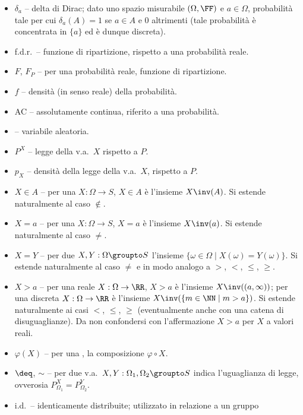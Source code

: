 \begin{multicols*}{2}
\begin{itemize}
        \item $\delta_a$ -- delta di Dirac; dato uno spazio misurabile $(\Omega, \FF)$ e $a \in \Omega$, probabilità tale per cui
        $\delta_a(A) = 1$ se $a \in A$ e $0$ altrimenti (tale probabilità è concentrata in $\{a\}$ ed è dunque
        discreta).
        \item f.d.r.~-- funzione di ripartizione, rispetto a una probabilità reale.
        \item $F$, $F_P$ -- per una probabilità reale, funzione di ripartizione.
        \item $f$ -- densità (in senso reale) della probabilità.
        \item AC -- assolutamente continua, riferito a una probabilità.
        \item \va -- variabile aleatoria.
        \item $P^X$ -- legge della v.a.~$X$ rispetto a $P$.
        \item $p_X$ -- densità della legge della v.a.~$X$, rispetto a $P$.
        \item $X \in A$ -- per una \va $X : \Omega \to S$,
        $X \in A$ è l'insieme $X\inv(A)$. Si estende naturalmente
        al caso $\notin$.
        \item $X = a$ -- per una \va $X : \Omega \to S$,
        $X = a$ è l'insieme $X\inv(a)$. Si estende naturalmente
        al caso $\neq$.
        \item $X = Y$ -- per due \va $X, Y : \Omega \groupto S$
        l'insieme $\{ \omega \in \Omega \mid X(\omega) = Y(\omega) \}$.
        Si estende naturalmente al caso $\neq$ e in modo analogo a $>$, $<$, $\leq$, $\geq$.
        \item $X > a$ -- per una \va reale $X : \Omega \to \RR$,
        $X > a$ è l'insieme $X\inv((a, \infty))$; per una \va discreta
        $X : \Omega \to \RR$ è l'insieme $X\inv(\{m \in \NN \mid m > a\})$.
        Si estende naturalmente ai casi $<$, $\leq$, $\geq$ (eventualmente
        anche con una catena di disuguaglianze). Da non confondersi con
        l'affermazione $X > a$ per $X$ a valori reali.
        \item $\varphi(X)$ -- per una \va, la composizione $\varphi \circ X$.
        \item $\deq$, $\sim$ -- per due v.a.~$X, Y : \Omega_1, \Omega_2 \groupto S$
        indica l'uguaglianza di legge, ovverosia $P_{\Omega_1}^X = P_{\Omega_2}^Y$.
        \item i.d.~-- identicamente distribuite; utilizzato in relazione a un gruppo

\end{itemize}
\end{multicols*}
